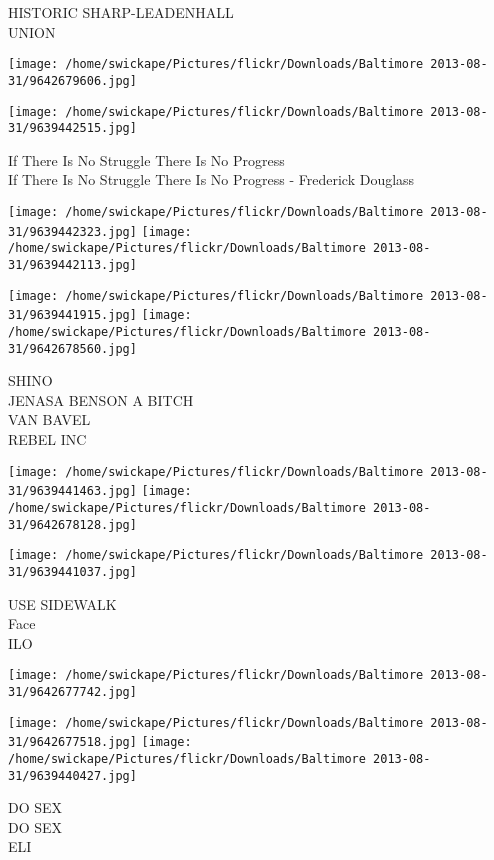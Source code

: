 \documentclass[10pt,letterpaper]{article}
\begin{document}
HISTORIC SHARP{-}LEADENHALL\\
UNION
\pagebreak

\texttt{[image: /home/swickape/Pictures/flickr/Downloads/Baltimore 2013-08-31/9642679606.jpg]}

\vspace{0.25in}
\texttt{[image: /home/swickape/Pictures/flickr/Downloads/Baltimore 2013-08-31/9639442515.jpg]}

If There Is No Struggle There Is No Progress\\
If There Is No Struggle There Is No Progress {-} Frederick Douglass
\pagebreak

\texttt{[image: /home/swickape/Pictures/flickr/Downloads/Baltimore 2013-08-31/9639442323.jpg]}
\texttt{[image: /home/swickape/Pictures/flickr/Downloads/Baltimore 2013-08-31/9639442113.jpg]}

\texttt{[image: /home/swickape/Pictures/flickr/Downloads/Baltimore 2013-08-31/9639441915.jpg]}
\texttt{[image: /home/swickape/Pictures/flickr/Downloads/Baltimore 2013-08-31/9642678560.jpg]}

SHINO\\
JENASA BENSON A BITCH\\
VAN BAVEL\\
REBEL INC
\pagebreak

\texttt{[image: /home/swickape/Pictures/flickr/Downloads/Baltimore 2013-08-31/9639441463.jpg]}
\texttt{[image: /home/swickape/Pictures/flickr/Downloads/Baltimore 2013-08-31/9642678128.jpg]}

\texttt{[image: /home/swickape/Pictures/flickr/Downloads/Baltimore 2013-08-31/9639441037.jpg]}

USE SIDEWALK\\
Face\\
ILO
\pagebreak

\texttt{[image: /home/swickape/Pictures/flickr/Downloads/Baltimore 2013-08-31/9642677742.jpg]}

\vspace{0.25in}
\texttt{[image: /home/swickape/Pictures/flickr/Downloads/Baltimore 2013-08-31/9642677518.jpg]}
\texttt{[image: /home/swickape/Pictures/flickr/Downloads/Baltimore 2013-08-31/9639440427.jpg]}

DO SEX\\
DO SEX\\
ELI
\pagebreak
\end{document}
